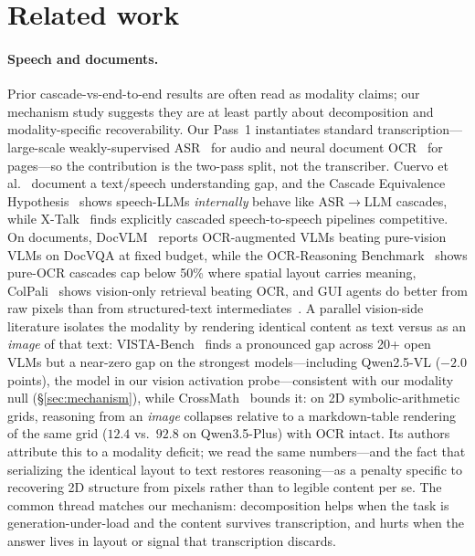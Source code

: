\documentclass[11pt]{article}
\begin{document}
\section{Related work}
\label{sec:related}

\paragraph{Speech and documents.} Prior cascade-vs-end-to-end results are often read as modality claims; our mechanism study suggests they are at least partly about decomposition and modality-specific recoverability. Our Pass~1 instantiates standard transcription---large-scale weakly-supervised ASR~\cite{radford2022whisper} for audio and neural document OCR~\cite{blecher2023nougat} for pages---so the contribution is the two-pass split, not the transcriber. Cuervo et al.~\cite{cuervo2025closing} document a text/speech understanding gap, and the Cascade Equivalence Hypothesis~\cite{ceh2026} shows speech-LLMs \emph{internally} behave like ASR$\to$LLM cascades, while X-Talk~\cite{xtalk2025} finds explicitly cascaded speech-to-speech pipelines competitive. On documents, DocVLM~\cite{docvlm2024} reports OCR-augmented VLMs beating pure-vision VLMs on DocVQA at fixed budget, while the OCR-Reasoning Benchmark~\cite{ocrreasoning2026} shows pure-OCR cascades cap below 50\% where spatial layout carries meaning, ColPali~\cite{colpali2025} shows vision-only retrieval beating OCR, and GUI agents do better from raw pixels than from structured-text intermediates~\cite{uground2024,uitars2025}. A parallel vision-side literature isolates the modality by rendering identical content as text versus as an \emph{image} of that text: VISTA-Bench~\cite{vistabench2026} finds a pronounced gap across 20+ open VLMs but a near-zero gap on the strongest models---including Qwen2.5-VL ($-2.0$ points), the model in our vision activation probe---consistent with our modality null (\S\ref{sec:mechanism}), while CrossMath~\cite{crossmath2026} bounds it: on 2D symbolic-arithmetic grids, reasoning from an \emph{image} collapses relative to a markdown-table rendering of the same grid ($12.4$ vs.\ $92.8$ on Qwen3.5-Plus) with OCR intact. Its authors attribute this to a modality deficit; we read the same numbers---and the fact that serializing the identical layout to text restores reasoning---as a penalty specific to recovering 2D structure from pixels rather than to legible content per se. The common thread matches our mechanism: decomposition helps when the task is generation-under-load and the content survives transcription, and hurts when the answer lives in layout or signal that transcription discards.
\end{document}
